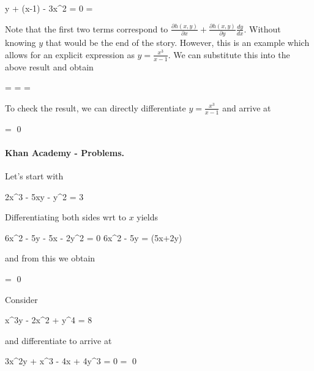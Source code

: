 \bee
y + (x-1)  - 3x^2 = 0 \rightarrow {} = 
\eee

Note that the first two terms correspond to $\frac{\partial h(x,y)}{\partial x} + \frac{\partial h(x,y)}{\partial y}\frac{dy}{dx}$. Without knowing $y$ that would be the end of the story. However, this is an example which allows for an explicit expression as $y = \frac{x^3}{x-1}$. We can substitute this into the above result and obtain

\bee
{} =  =  = 
\eee

To check the result, we can directly differentiate $y = \frac{x^3}{x-1}$ and arrive at

\bee
{} =  \qed
\eee

\paragraph{Khan Academy - Problems.} Let's start with

\bee
2x^3 - 5xy - y^2 = 3
\eee

Differentiating both sides wrt to $x$ yields

\bee
6x^2 - 5y - 5x  - 2y^2  = 0 \rightarrow 6x^2 - 5y = (5x+2y) 
\eee

and from this we obtain

\bee
{} =  \qed
\eee

Consider 

\bee
x^3y - 2x^2 + y^4 = 8
\eee

and differentiate to arrive at

\bee
3x^2y + x^3  - 4x + 4y^3  = 0 \rightarrow {} =  \qed
\eee
